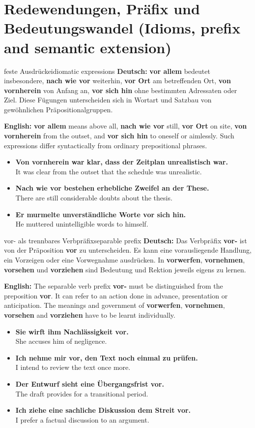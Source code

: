 \documentclass[a4paper,11pt]{article}
\newcommand{\GermanText}[1]{\textbf{Deutsch: }#1\par}
\newcommand{\EnglishText}[1]{{\small\color{SoftGray}\textbf{English: }#1\par}}
\newcommand{\ExampleItem}[2]{\item \textbf{#1}\\{\small\color{SoftGray}#2}}
\begin{document}
    \section{Redewendungen, Präfix und Bedeutungswandel (Idioms, prefix and semantic extension)}
        \begin{grammarentry}{feste Ausdrücke}{idiomatic expressions}
            \GermanText{\textbf{vor allem} bedeutet insbesondere, \textbf{nach wie vor} weiterhin, \textbf{vor Ort} am betreffenden Ort, \textbf{von vornherein} von Anfang an, \textbf{vor sich hin} ohne bestimmten Adressaten oder Ziel. Diese Fügungen unterscheiden sich in Wortart und Satzbau von gewöhnlichen Präpositionalgruppen.}
            \EnglishText{\textbf{vor allem} means above all, \textbf{nach wie vor} still, \textbf{vor Ort} on site, \textbf{von vornherein} from the outset, and \textbf{vor sich hin} to oneself or aimlessly. Such expressions differ syntactically from ordinary prepositional phrases.}
        \end{grammarentry}
        \begin{exbox}
            \begin{itemize}
                \ExampleItem{Von vornherein war klar, dass der Zeitplan unrealistisch war.}{It was clear from the outset that the schedule was unrealistic.}
                \ExampleItem{Nach wie vor bestehen erhebliche Zweifel an der These.}{There are still considerable doubts about the thesis.}
                \ExampleItem{Er murmelte unverständliche Worte vor sich hin.}{He muttered unintelligible words to himself.}
            \end{itemize}
        \end{exbox}
        \begin{grammarentry}{vor- als trennbares Verbpräfix}{separable prefix}
            \GermanText{Das Verbpräfix \textbf{vor-} ist von der Präposition \textbf{vor} zu unterscheiden. Es kann eine vorausliegende Handlung, ein Vorzeigen oder eine Vorwegnahme ausdrücken. In \textbf{vorwerfen}, \textbf{vornehmen}, \textbf{vorsehen} und \textbf{vorziehen} sind Bedeutung und Rektion jeweils eigens zu lernen.}
            \EnglishText{The separable verb prefix \textbf{vor-} must be distinguished from the preposition \textbf{vor}. It can refer to an action done in advance, presentation or anticipation. The meanings and government of \textbf{vorwerfen}, \textbf{vornehmen}, \textbf{vorsehen} and \textbf{vorziehen} have to be learnt individually.}
        \end{grammarentry}
        \begin{exbox}
            \begin{itemize}
                \ExampleItem{Sie wirft ihm Nachlässigkeit vor.}{She accuses him of negligence.}
                \ExampleItem{Ich nehme mir vor, den Text noch einmal zu prüfen.}{I intend to review the text once more.}
                \ExampleItem{Der Entwurf sieht eine Übergangsfrist vor.}{The draft provides for a transitional period.}
                \ExampleItem{Ich ziehe eine sachliche Diskussion dem Streit vor.}{I prefer a factual discussion to an argument.}
            \end{itemize}
        \end{exbox}
\end{document}
